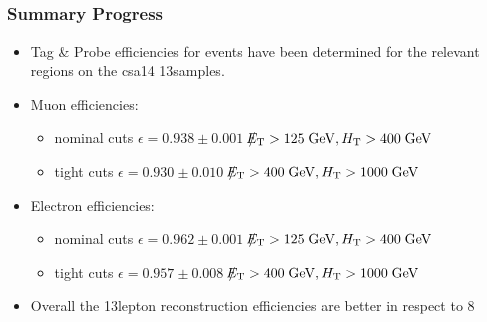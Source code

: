 \documentclass{beamer}
\begin{document}

\subsection{\Zll}
\begin{frame}
\frametitle{Summary Progress \Zll}
 \begin{itemize}
  \item Tag \& Probe efficiencies for \Zll events have been determined for the relevant regions on the csa14 13\tev samples.
  \item Muon efficiencies:
  \begin{itemize}
  \item nominal cuts $\epsilon = 0.938 \pm 0.001$ $\slash\mkern-12mu{E}_{\text{T}} > 125 \;\text{Ge}\kern-0.06667em\text{V}, H_{\text{T}} > 400 \;\text{Ge}\kern-0.06667em\text{V} $
   \item tight cuts  $\epsilon = 0.930 \pm 0.010$ $\slash\mkern-12mu{E}_{\text{T}} > 400 \;\text{Ge}\kern-0.06667em\text{V}, H_{\text{T}} > 1000 \;\text{Ge}\kern-0.06667em\text{V} $
  \end{itemize}
  \item Electron efficiencies:
  \begin{itemize}
  \item nominal cuts $\epsilon = 0.962 \pm0.001$ $\slash\mkern-12mu{E}_{\text{T}} > 125 \;\text{Ge}\kern-0.06667em\text{V}, H_{\text{T}} > 400 \;\text{Ge}\kern-0.06667em\text{V} $
   \item tight cuts  $\epsilon = 0.957 \pm 0.008$ $\slash\mkern-12mu{E}_{\text{T}} > 400 \;\text{Ge}\kern-0.06667em\text{V}, H_{\text{T}} > 1000 \;\text{Ge}\kern-0.06667em\text{V} $
  \end{itemize}
  \item Overall the 13\tev lepton reconstruction efficiencies are better in respect to 8\tev
 \end{itemize}

\end{frame}

\end{document}
